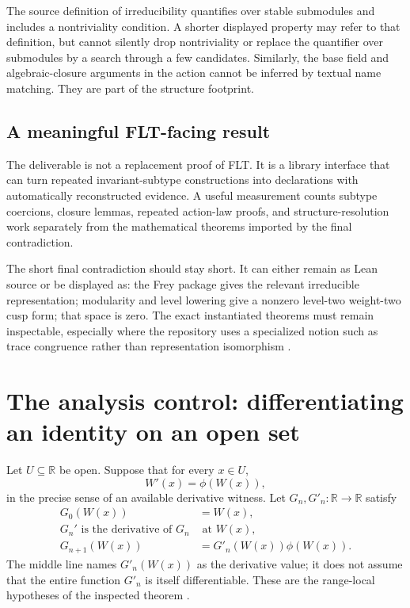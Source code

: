 \documentclass[11pt,a4paper]{article}
\newcommand{\R}{\mathbb R}
\theoremstyle{plain}
\theoremstyle{definition}
\begin{document}
The source definition of irreducibility quantifies over stable submodules and includes a nontriviality condition. A shorter displayed property may refer to that definition, but cannot silently drop nontriviality or replace the quantifier over submodules by a search through a few candidates. Similarly, the base field and algebraic-closure arguments in the action cannot be inferred by textual name matching. They are part of the structure footprint.

\subsection{A meaningful FLT-facing result}
The deliverable is not a replacement proof of FLT. It is a library interface that can turn repeated invariant-subtype constructions into declarations with automatically reconstructed evidence. A useful measurement counts subtype coercions, closure lemmas, repeated action-law proofs, and structure-resolution work separately from the mathematical theorems imported by the final contradiction.

The short final contradiction should stay short. It can either remain as Lean source or be displayed as: the Frey package gives the relevant irreducible representation; modularity and level lowering give a nonzero level-two weight-two cusp form; that space is zero. The exact instantiated theorems must remain inspectable, especially where the repository uses a specialized notion such as trace congruence rather than representation isomorphism \cite{freytail,proofpath}.

\section{The analysis control: differentiating an identity on an open set}\label{sec:analysis}

Let $U\subseteq\R$ be open. Suppose that for every $x\in U$,
\[
 W'(x)=\phi(W(x)),
\]
in the precise sense of an available derivative witness. Let $G_n,G'_n:\R\to\R$ satisfy
\begin{align*}
 G_0(W(x))&=W(x),\\
 G_n'\text{ is the derivative of }G_n&\text{ at }W(x),\\
 G_{n+1}(W(x))&=G'_n(W(x))\phi(W(x)).
\end{align*}
The middle line names $G'_n(W(x))$ as the derivative value; it does not assume that the entire function $G'_n$ is itself differentiable. These are the range-local hypotheses of the inspected theorem \cite{autonomous}.
\end{document}
